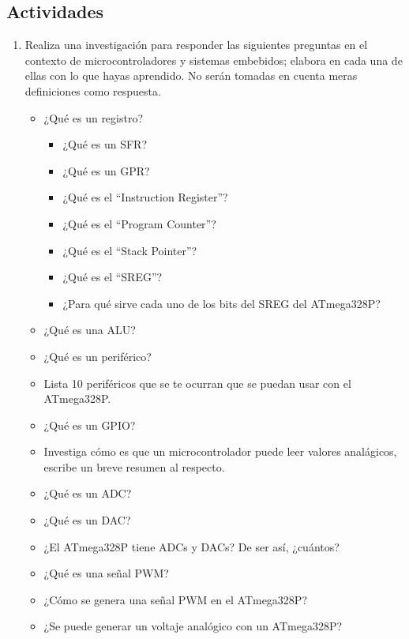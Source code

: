 \documentclass[11pt,letterpaper]{article}
\begin{document}
\subsection*{Actividades}
\begin{enumerate}[label=\arabic*)]
    \item Realiza una investigación para responder las siguientes preguntas en el contexto de microcontroladores y sistemas embebidos; elabora en cada una de ellas con lo que hayas aprendido. No serán tomadas en cuenta meras definiciones como respuesta.
    \begin{itemize}
        \item ¿Qué es un registro?
        \begin{itemize}
            \item ¿Qué es un SFR?
            \item ¿Qué es un GPR?
            \item ¿Qué es el ``Instruction Register''?
            \item ¿Qué es el ``Program Counter''?
            \item ¿Qué es el ``Stack Pointer''?
            \item ¿Qué es el ``SREG''?
            \item ¿Para qué sirve cada uno de los bits del SREG del ATmega328P?
        \end{itemize}
        \item ¿Qué es una ALU?
        \item ¿Qué es un periférico?
        \item Lista 10 periféricos que se te ocurran que se puedan usar con el ATmega328P.
        \item ¿Qué es un GPIO?
        \item Investiga cómo es que un microcontrolador puede leer valores analágicos, escribe un breve resumen al respecto.
        \item ¿Qué es un ADC?
        \item ¿Qué es un DAC?
        \item ¿El ATmega328P tiene ADCs y DACs? De ser así, ¿cuántos?
        \item ¿Qué es una señal PWM?
        \item ¿Cómo se genera una señal PWM en el ATmega328P?
        \item ¿Se puede generar un voltaje analógico con un ATmega328P?
    \end{itemize}
\end{enumerate}
\end{document}
